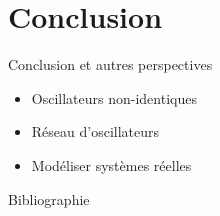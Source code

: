 
\section{Conclusion}
\begin{frame}{Conclusion et autres perspectives}
  \begin{itemize}
    \item Oscillateurs non-identiques
    \item Réseau d'oscillateurs
    \item Modéliser systèmes réelles
  \end{itemize}
\end{frame}

\begin{frame}{Bibliographie}
    \TINY
    \printbibliography
\end{frame}



